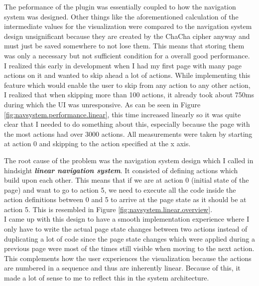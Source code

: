 The peformance of the plugin was essentially coupled to how the navigation system was designed. Other things like the aforementioned calculation of the intermediate values for the visualization were compared to the navigation system design unsignificant because they are created by the ChaCha cipher anyway and must just be saved somewhere to not lose them. This means that storing them was only a necessary but not sufficient condition for a overall good performance. \\
I realized this early in development when I had my first page with many page actions on it and wanted to skip ahead a lot of actions. While implementing this feature which would enable the user to skip from any action to any other action, I realized that when skipping more than 100 actions, it already took about 750ms during which the UI was unresponsive. As can be seen in Figure \ref{fig:navsystem.performance.linear}, this time increased linearly so it was quite clear that I needed to do something about this, especially because the page with the most actions had over 3000 actions. All measurements were taken by starting at action 0 and skipping to the action specified at the x axis.

The root cause of the problem was the navigation system design which I called in hindsight \textbf{\textit{linear navigation system}}. It consisted of defining actions which build upon each other. This means that if we are at action 0 (initial state of the page) and want to go to action 5, we need to execute all the code inside the action definitions between 0 and 5 to arrive at the page state as it should be at action 5. This is resembled in Figure \ref{fig:navsystem.linear.overview}. \\
I came up with this design to have a smooth implementation experience where I only have to write the actual page state changes between two actions instead of duplicating a lot of code since the page state changes which were applied during a previous page were most of the times still visible when moving to the next action. This complements how the user experiences the visualization because the actions are numbered in a sequence and thus are inherently linear. Because of this, it made a lot of sense to me to reflect this in the system architecture.


